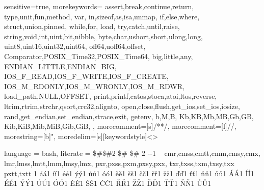 {
    sensitive=true,
    morekeywords={%
        assert,break,continue,return,
        type,unit,fun,method,
        var,
        in,sizeof,as,isa,unmap,
        if,else,where,
        struct,union,pinned,
        while,for,
        load,
        try,catch,until,raise,
        string,void,int,uint,bit,nibble,
        byte,char,ushort,short,ulong,long,
        uint8,uint16,uint32,uint64,
        off64,uoff64,offset,
        Comparator,POSIX_Time32,POSIX_Time64,
        big,little,any,
        ENDIAN_LITTLE,ENDIAN_BIG,
        IOS_F_READ,IOS_F_WRITE,IOS_F_CREATE,
        IOS_M_RDONLY,IOS_M_WRONLY,IOS_M_RDWR,
        load_path,NULL,OFFSET,
        print,printf,catos,stoca,atoi,ltos,reverse,
        ltrim,rtrim,strchr,qsort,crc32,alignto,
        open,close,flush,get_ios,set_ios,iosize,
        rand,get_endian,set_endian,strace,exit,
        getenv,
        b,M,B,
        Kb,KB,Mb,MB,Gb,GB,
        Kib,KiB,Mib,MiB,Gib,GiB,
    },
    morecomment=[s]{/*}{*/},
    morecomment=[l]//,
    morestring=[b]",
    moredelim=[s][keywordstyle]{<}{>}  %
}

\makeatletter
\newcommand\midtilde@raisedtilde[1][.5]{\raisebox{#1ex}{\texttildelow}}
\def\midtilde@normaltilde{\texttildelow}

\newcommand\midtilde%
{%
  \expandafter\in@\expandafter{\f@family}%
    {cmr,cmss,cmtt,cmm,cmsy,cmx,%
    lmr,lmss,lmtt,lmm,lmsy,lmx,%
    pxr,pxss,pxm,pxsy,pxx,%
    txr,txss,txm,txsy,txx}%
  \ifin@%
    \midtilde@raisedtilde%
  \else%
    \expandafter\in@\expandafter{\f@family}%
    {pxtt,txtt}%
    \ifin@%
      \midtilde@raisedtilde[.35]%
    \else%
      \midtilde@normaltilde%
    \fi%
  \fi%
}
\makeatother
{}
{
    language = bash,
    literate =%
        {\$\#}{{{\$\#}}}2 {\$\# }{{{\$\# }}}2
        {-}{{-}}1
        {~}{{\midtilde}}1
        {á}{{\'a}}1
        {í}{{\'i}}1
        {é}{{\'e}}1
        {ý}{{\'y}}1
        {ú}{{\'u}}1
        {ó}{{\'o}}1
        {ě}{{\v{e}}}1
        {š}{{\v{s}}}1
        {č}{{\v{c}}}1
        {ř}{{\v{r}}}1
        {ž}{{\v{z}}}1
        {ď}{{\v{d}}}1
        {ť}{{\v{t}}}1
        {ň}{{\v{n}}}1
        {ů}{{\r{u}}}1
        {Á}{{\'A}}1
        {Í}{{\'I}}1
        {É}{{\'E}}1
        {Ý}{{\'Y}}1
        {Ú}{{\'U}}1
        {Ó}{{\'O}}1
        {Ě}{{\v{E}}}1
        {Š}{{\v{S}}}1
        {Č}{{\v{C}}}1
        {Ř}{{\v{R}}}1
        {Ž}{{\v{Z}}}1
        {Ď}{{\v{D}}}1
        {Ť}{{\v{T}}}1
        {Ň}{{\v{N}}}1
        {Ů}{{\r{U}}}1
}
